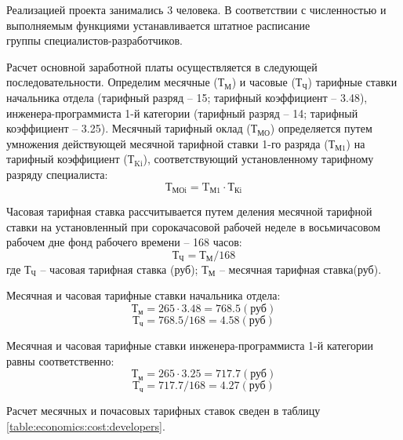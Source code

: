 Реализацией проекта занимались 3 человека. В соответствии с численностью и выполняемым функциями устанавливается штатное расписание \\группы специалистов-разработчиков.

Расчет основной заработной платы осуществляется в следующей последовательности. Определим месячные (${\text{Т}}_{\text{М}}$) и часовые (${\text{Т}}_{\text{Ч}}$) тарифные ставки начальника отдела (тарифный разряд -- 15; тарифный коэффициент – 3.48), инженера-программиста 1-й категории (тарифный разряд -- 14; тарифный коэффициент -- 3.25). Месячный тарифный оклад (${\text{Т}}_{\text{МО}}$) определяется путем умножения действующей месячной тарифной ставки 1-го разряда (${\text{Т}}_{\text{М1}}$) на тарифный коэффициент (${\text{Т}}_{\text{Ki}}$), соответствующий установленному тарифному разряду специалиста:
\begin{equation}
\label{formula:economics:cost:f_tmoi}
{\text{Т}}_{\text{МОi}} = {\text{T}}_{\text{М1}} \cdot {\text{Т}}_{\text{Кi}}
\end{equation}

Часовая тарифная ставка рассчитывается путем деления месячной тарифной ставки на установленный при сорокачасовой рабочей неделе в восьмичасовом рабочем дне фонд рабочего времени – 168 часов:
\begin{equation}
\label{formula:economics:cost:f_chts}
{\text{Т}}_{\text{Ч}} = {\text{Т}}_{\text{М}} / 168
\end{equation}
где ${\text{Т}}_{\text{Ч}}$ -- часовая тарифная ставка (руб); ${\text{Т}}_{\text{М}}$ -- месячная тарифная ставка(руб).

Месячная и часовая тарифные ставки начальника отдела:
$${\text{Т}}_{\text{м}} = 265 \cdot 3.48 = 768.5 (\text{руб})$$
$${\text{Т}}_{\text{ч}} = 768.5 / 168 = 4.58 (\text{руб})$$

Месячная и часовая тарифные ставки инженера-программиста 1-й категории равны соответственно:
$${\text{Т}}_{\text{м}} = 265 \cdot 3.25 = 717.7 (\text{руб})$$
$${\text{Т}}_{\text{ч}} = 717.7 / 168 = 4.27 (\text{руб})$$

Расчет месячных и почасовых тарифных ставок сведен в таблицу \ref{table:economics:cost:developers}.

